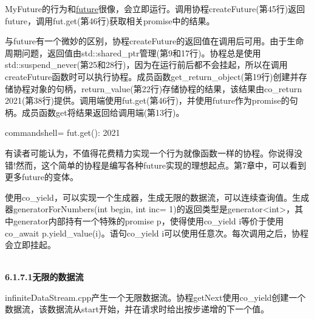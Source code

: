 MyFuture的行为和\href{https://en.cppreference.com/w/cpp/thread/future}{future}很像，会立即运行。调用协程createFuture(第45行)返回future，调用fut.get(第46行)获取相关promise中的结果。

与future有一个微妙的区别，协程createFuture的返回值在调用后可用。由于生命周期问题，返回值由std::shared\_ptr管理(第9和17行)。协程总是使用std::suspend\_never(第25和28行)，因为在运行前后都不会挂起，所以在调用createFuture函数时可以执行协程。成员函数get\_return\_object(第19行)创建并存储协程对象的句柄，return\_value(第22行)存储协程的结果，该结果由co\_return 2021(第38行)提供。调用端使用fut.get(第46行)，并使用future作为promise的句柄。成员函数get将结果返回给调用端(第13行)。

\begin{tcblisting}{commandshell={}}
fut.get(): 2021
\end{tcblisting}

有读者可能认为，不值得花费精力实现一个行为就像函数一样的协程。你说得没错!然而，这个简单的协程是编写各种future实现的理想起点。第7章中，可以看到更多future的变体。


使用co\_yield，可以实现一个生成器，生成无限的数据流，可以连续查询值。生成器generatorForNumbers(int begin, int inc= 1)的返回类型是generator<int>，其中generator内部持有一个特殊的promise p，使得使用co\_yield i等价于使用co\_await p.yield\_value(i)。语句co\_yield i可以使用任意次。每次调用之后，协程会立即挂起。

\hspace*{\fill} \\ %
\noindent
\textbf{6.1.7.1\hspace{0.2cm}无限的数据流}

infiniteDataStream.cpp产生一个无限数据流。协程getNext使用co\_yield创建一个数据流，该数据流从start开始，并在请求时给出按步递增的下一个值。

